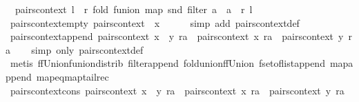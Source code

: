 \begin{isabellebody}
\ \ {\isachardoublequoteopen}pairs{}context\ l\ {\isacharequal}\ {\isacharparenleft}{\isasymlambda}r{\isachardot}\ fold\ funion\ {\isacharparenleft}map\ snd\ {\isacharparenleft}filter\ {\isacharparenleft}{\isasymlambda}{\isacharparenleft}a{\isacharcomma}\ {\isacharunderscore}{\isacharparenright}{\isachardot}\ a\ {\isacharequal}\ r{\isacharparenright}\ l{\isacharparenright}{\isacharparenright}\ {\isacharbraceleft}{\isacharbar}{\isacharbar}{\isacharbraceright}{\isacharparenright}{\isachardoublequoteclose}\isanewline
\isanewline
{}\isamarkupfalse%
\ pairs{}context{\isacharunderscore}empty{\isacharcolon}\ {\isachardoublequoteopen}pairs{}context\ {\isacharbrackleft}{\isacharbrackright}\ x\ {\isacharequal}\ {\isacharbraceleft}{\isacharbar}{\isacharbar}{\isacharbraceright}{\isachardoublequoteclose}\isanewline
%
\isadelimproof
\ \ %
\endisadelimproof
%
\isatagproof
{}\isamarkupfalse%
\ {\isacharparenleft}simp\ add{\isacharcolon}\ pairs{}context{\isacharunderscore}def{\isacharparenright}%
\endisatagproof
{\isafoldproof}%
%
\isadelimproof
\isanewline
%
\endisadelimproof
\isanewline
{}\isamarkupfalse%
\ pairs{}context{\isacharunderscore}append{\isacharcolon}\ {\isachardoublequoteopen}pairs{}context\ {\isacharparenleft}x\ {\isacharat}\ y{\isacharparenright}\ ra\ {\isacharequal}\ pairs{}context\ x\ ra\ {\isacharbar}{\isasymunion}{\isacharbar}\ pairs{}context\ y\ ra{\isachardoublequoteclose}\isanewline
%
\isadelimproof
\ \ %
\endisadelimproof
%
\isatagproof
{}\isamarkupfalse%
\ {\isacharparenleft}simp\ only{\isacharcolon}\ pairs{}context{\isacharunderscore}def{\isacharparenright}\isanewline
\ \ \isamarkupfalse%
\ {\isacharparenleft}metis\ ffUnion{\isacharunderscore}funion{\isacharunderscore}distrib\ filter{\isacharunderscore}append\ fold{\isacharunderscore}union{\isacharunderscore}ffUnion\ fset{\isacharunderscore}of{\isacharunderscore}list{\isacharunderscore}append\ map{\isacharunderscore}append\ map{\isacharunderscore}eq{\isacharunderscore}map{\isacharunderscore}tailrec{\isacharparenright}%
\endisatagproof
{\isafoldproof}%
%
\isadelimproof
\isanewline
%
\endisadelimproof
\isanewline
{}\isamarkupfalse%
\ pairs{}context{\isacharunderscore}cons{\isacharcolon}\ {\isachardoublequoteopen}pairs{}context\ {\isacharparenleft}x\ {\isacharhash}\ y{\isacharparenright}\ ra\ {\isacharequal}\ pairs{}context\ {\isacharbrackleft}x{\isacharbrackright}\ ra\ {\isacharbar}{\isasymunion}{\isacharbar}\ pairs{}context\ y\ ra{\isachardoublequoteclose}\isanewline

\end{isabellebody}
